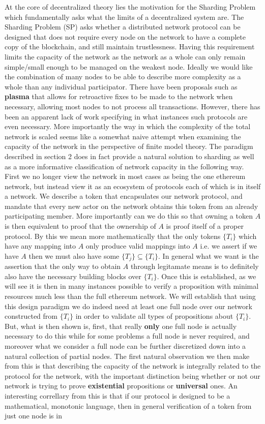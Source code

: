 \documentclass[12pt]{amsart}
\begin{document}
At the core of decentralized theory lies the motivation for the Sharding Problem which fundamentally asks what the limits of a decentralized system are. The Sharding Problem (SP) asks whether a distributed network protocol can be designed that does not require every node on the network to have a complete copy of the blockchain, and still maintain trustlessness. Having this requirement limits the capacity of the network as the network as a whole can only remain simple/small enough to be managed on the weakest node. Ideally we would like the combination of many nodes to be able to describe more complexity as a whole than any individual participator. There have been proposals such as \textbf{plasma} that allows for retroactive fixes to be made to the network when necessary, allowing most nodes to not process all transactions. However, there has been an apparent lack of work specifying in what instances such protocols are even necessary. More importantly the way in which the complexity of the total network is scaled seems like a somewhat naive attempt when examining the capacity of the network in the perspective of finite model theory. The paradigm described in section 2 does in fact provide a natural solution to sharding as well as a more informative classification of network capacity in the following way. First we no longer view the network in most cases as being the one ethereum network, but instead view it as an ecosystem of protocols each of which is in itself a network. We describe a token that encapsulates our network protocol, and mandate that every new actor on the network obtains this token from an already participating member. More importantly can we do this so that owning a token $A$ is then equivalent to proof that the ownership of $A$ is proof itself of a proper protocol. By this we mean more mathematically that the only tokens $\{T_i\}$ which have any mapping into $A$ only produce valid mappings into $A$ i.e. we assert if we have $A$ then we must also have some $\{T_j\}\subseteq \{T_i\}$. In general what we want is the assertion that the only way to obtain $A$ through legitamate means is to definitely also have the necessary building blocks over $\{T_i\}$. Once this is established, as we will see it is then in many instances possible to verify a proposition with minimal resources much less than the full ethereum network. We will establish that using this design paradigm we do indeed need at least one full node over our network constructed from $\{T_i\}$ in order to validate all types of propositions about $\{T_i\}$. But, what is then shown is, first, that really \textbf{only} one full node is actually necessary to do this while for some problems a full node is never required, and moreover what we consider a full node can be further discretized down into a natural collection of partial nodes. The first natural observation we then make from this is that describing the capacity of the network is integrally related to the protocol for the network, with the important distinction being whether or not our network is trying to prove \textbf{existential} propositions or \textbf{universal} ones. An interesting correllary from this is that if our protocol is designed to be a mathematical, monotonic language, then in general verification of a token from just one node is in 
\end{document}
